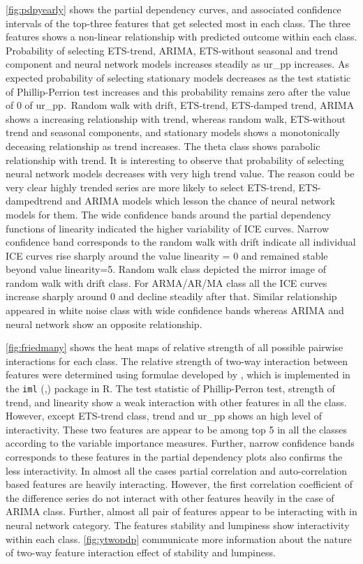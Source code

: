 \documentclass[11pt,a4paper,]{article}
\begin{document}
\autoref{fig:pdpyearly} shows the partial dependency curves, and
associated confidence intervals of the top-three features that get
selected most in each class. The three features shows a non-linear
relationship with predicted outcome within each class. Probability of
selecting ETS-trend, ARIMA, ETS-without seasonal and trend component and
neural network models increases steadily as ur\_pp increases. As
expected probability of selecting stationary models decreases as the
test statistic of Phillip-Perrion test increases and this probability
remains zero after the value of 0 of ur\_pp.~Random walk with drift,
ETS-trend, ETS-damped trend, ARIMA shows a increasing relationship with
trend, whereas random walk, ETS-without trend and seasonal components,
and stationary models shows a monotonically deceasing relationship as
trend increases. The theta class shows parabolic relationship with
trend. It is interesting to observe that probability of selecting neural
network models decreases with very high trend value. The reason could be
very clear highly trended series are more likely to select ETS-trend,
ETS-dampedtrend and ARIMA models which lesson the chance of neural
network models for them. The wide confidence bands around the partial
dependency functions of linearity indicated the higher variability of
ICE curves. Narrow confidence band corresponds to the random walk with
drift indicate all individual ICE curves rise sharply around the value
linearity = 0 and remained stable beyond value linearity=5. Random walk
class depicted the mirror image of random walk with drift class. For
ARMA/AR/MA class all the ICE curves increase sharply around 0 and
decline steadily after that. Similar relationship appeared in white
noise class with wide confidence bands whereas ARIMA and neural network
show an opposite relationship.

\autoref{fig:friedmany} shows the heat maps of relative strength of all
possible pairwise interactions for each class. The relative strength of
two-way interaction between features were determined using formulae
developed by \textcite{friedman2008predictive}, which is implemented in
the \texttt{iml} (\textcite{molnar2018iml},) package in R. The test
statistic of Phillip-Perron test, strength of trend, and linearity show
a weak interaction with other features in all the class. However, except
ETS-trend class, trend and ur\_pp shows an high level of interactivity.
These two features are appear to be among top 5 in all the classes
according to the variable importance measures. Further, narrow
confidence bands corresponds to these features in the partial dependency
plots also confirms the less interactivity. In almost all the cases
partial correlation and auto-correlation based features are heavily
interacting. However, the first correlation coefficient of the
difference series do not interact with other features heavily in the
case of ARIMA class. Further, almost all pair of features appear to be
interacting with in neural network category. The features stability and
lumpiness show interactivity within each class. \autoref{fig:ytwopdp}
communicate more information about the nature of two-way feature
interaction effect of stability and lumpiness.
\end{document}
